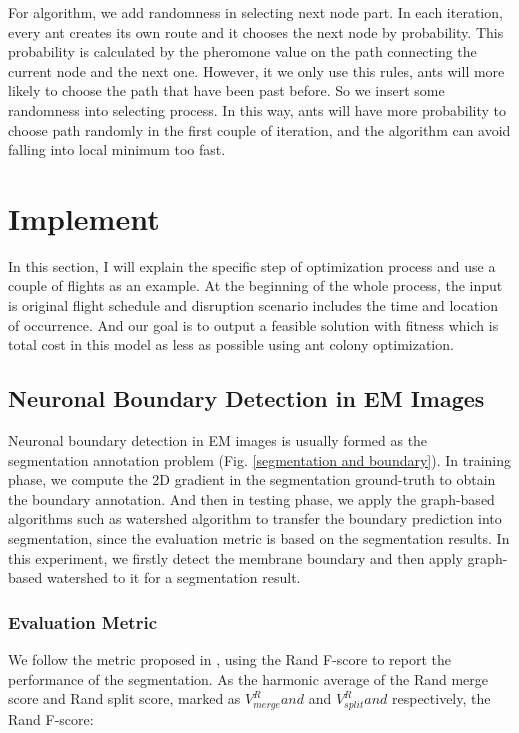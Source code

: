 \documentclass[senior]{IPSstyle}
\begin{document}
For algorithm, we add randomness in selecting next node part. In each iteration, every ant creates its own route and it chooses the next node by probability. This probability is calculated by the pheromone value on the path connecting the current node and the next one. However, it we only use this rules, ants will more likely to choose the path that have been past before. So we insert some randomness into selecting process. In this way, ants will have more probability to choose path randomly in the first couple of iteration, and the algorithm can avoid falling into local minimum too fast.




\chapter{Implement} \label{implement}
In this section, I will explain the specific step of optimization process and use a couple of flights as an example. At the beginning of the whole process, the input is original flight schedule and disruption scenario includes the time and location of occurrence. And our goal is to output a feasible solution with fitness which is total cost in this model as less as possible using ant colony optimization.

\section{Neuronal Boundary Detection in EM Images}

Neuronal boundary detection in EM images is usually formed as the segmentation annotation problem (Fig. \ref{segmentation and boundary}). In training phase, we compute the 2D gradient in the segmentation ground-truth to obtain the boundary annotation. And then in testing phase, we apply the graph-based algorithms such as watershed algorithm to transfer the boundary prediction into segmentation, since the evaluation metric is based on the segmentation results. In this experiment, we firstly detect the membrane boundary and then apply graph-based watershed\cite{Zlateski2015} to it for a segmentation result.

\subsection{Evaluation Metric}

We follow the metric proposed in \cite{Lee2015}, using the Rand F-score to report the performance of the segmentation. As the harmonic average of the Rand merge score and Rand split score, marked as \(V_{merge}^Rand\) and \(V_{split}^Rand\) respectively, the Rand F-score:
\end{document}
